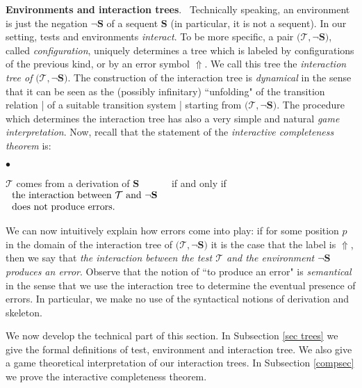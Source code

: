 \documentclass[copyright,creativecommons]{eptcs}
\newcommand{\cT}{\mathcal{T}}
\newcommand{\bS}{\mathbf{S}}
\theoremstyle{definition}
\newcommand{\squishlist}{
 \begin{list}{$\bullet$}
  { \setlength{\itemsep}{0pt}
     \setlength{\parsep}{3pt}
     \setlength{\topsep}{3pt}
     \setlength{\partopsep}{0pt}
     \setlength{\leftmargin}{1em}
     \setlength{\labelwidth}{1.5em}
     \setlength{\labelsep}{0.5em} } }
\newcommand{\squishend}{
  \end{list}  }
\begin{document}
\noindent \textbf{Environments and interaction trees}. \
Technically speaking, an environment is just
the negation $\neg \bS$ of a sequent $\bS$ (in particular, it is not a sequent).  In our setting,  tests and environments
\emph{interact}.
To be more specific, a pair
$\big(\cT,\neg \bS\big)$, called
\emph{configuration},
uniquely determines a tree which is labeled by configurations of the previous kind, or by  an error symbol $\Uparrow$. We call this tree the \emph{interaction tree of} $\big(\cT,\neg \bS\big)$.
The construction of the interaction tree is \emph{dynamical} in the sense that it can be seen as the (possibly
infinitary) ``unfolding" of the transition relation |  of a suitable  transition system |  starting from  $\big(\cT,\neg \bS\big)$. The procedure which determines the interaction tree has also a very simple and
natural  \emph{game interpretation}.
Now, recall that the statement of the \emph{interactive completeness theorem} is:
\vspace{-0.00cm}
\squishlist
\item[] {\centering
$\cT$ comes from a derivation  of $\bS$ \ \ \ \ \ \ if and only if \ \ \ \ \ \ $\left.
  \begin{array}{l}
  \hbox{the interaction between $\cT$ and $\neg \bS$} \\
  \hbox{does not
produce errors.}   \end{array}
\right.$ \par}
\squishend


\noindent We can now intuitively explain
how errors
come into play:
if for some position $p$ in the domain of the interaction tree of $\big(\cT,\neg \bS\big)$ it is the case that the label is
$\Uparrow$, then we  say that \emph{the interaction between the test $\cT$ and the environment $\neg \bS$ produces an error}.
 Observe that the notion of ``to produce an error" is
\emph{semantical} in the sense that we use the interaction
tree to determine the eventual presence of errors. In particular, we make no use of  the syntactical notions of derivation and skeleton. \\









\vspace{-0.3cm}


We now develop the technical part of this section.
In Subsection \ref{sec trees} we give the formal definitions
of test, environment and interaction tree. We also give
a game theoretical interpretation  of our   interaction trees.
 In Subsection \ref{compsec} we  prove the interactive completeness theorem.
\end{document}

